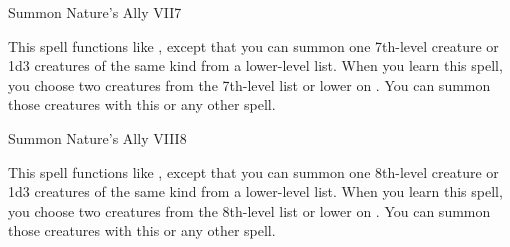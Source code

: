 \begin{spellsection}{Summon Nature's Ally VII}{7}
\begin{spellheader}
\end{spellheader}
\begin{spellcontent}
    \spelleffect This spell functions like , except that you can summon one 7th-level creature or 1d3 creatures of the same kind from a lower-level list. When you learn this spell, you choose two creatures from the 7th-level list or lower on . You can summon those creatures with this or any other  spell.
    \spelldur \durshort \dismissable
\end{spellcontent}
\begin{spellfooter}
\end{spellfooter}
\end{spellsection}

\begin{spellsection}{Summon Nature's Ally VIII}{8}
\begin{spellheader}
\end{spellheader}
\begin{spellcontent}
    \spelleffect This spell functions like , except that you can summon one 8th-level creature or 1d3 creatures of the same kind from a lower-level list. When you learn this spell, you choose two creatures from the 8th-level list or lower on . You can summon those creatures with this or any other  spell.
    \spelldur \durshort \dismissable
\end{spellcontent}
\begin{spellfooter}
\end{spellfooter}
\end{spellsection}

